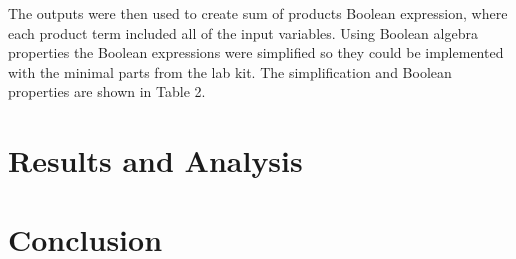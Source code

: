 \documentclass[CMPE]{KGCOEReport}
\begin{document}
The outputs were then used to create sum of products Boolean expression, where each product term included all of the input variables. Using Boolean algebra properties the Boolean expressions were simplified so they could be implemented with the minimal parts from the lab kit. The simplification and Boolean properties are shown in Table 2.

\section*{Results and Analysis}

\section*{Conclusion}
\end{document}
